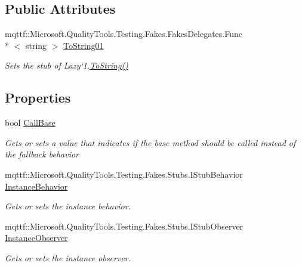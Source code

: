 \subsection*{Public Attributes}
\begin{DoxyCompactItemize}
\item 
mqttf\-::\-Microsoft.\-Quality\-Tools.\-Testing.\-Fakes.\-Fakes\-Delegates.\-Func\\*
$<$ string $>$ \hyperlink{class_system_1_1_fakes_1_1_stub_lazy_3_01_t_01_4_acf1f1cfa09104eeb7c24dbcd9a92a16c}{To\-String01}
\begin{DoxyCompactList}\small\item\em Sets the stub of Lazy`1.\hyperlink{class_system_1_1_fakes_1_1_stub_lazy_3_01_t_01_4_aee5547fcc578aeced2fc205244ccb84b}{To\-String()}\end{DoxyCompactList}\end{DoxyCompactItemize}
\subsection*{Properties}
\begin{DoxyCompactItemize}
\item 
bool \hyperlink{class_system_1_1_fakes_1_1_stub_lazy_3_01_t_01_4_a10e1278a602330f56e3e1078c9ff6a93}{Call\-Base}
\begin{DoxyCompactList}\small\item\em Gets or sets a value that indicates if the base method should be called instead of the fallback behavior\end{DoxyCompactList}\item 
mqttf\-::\-Microsoft.\-Quality\-Tools.\-Testing.\-Fakes.\-Stubs.\-I\-Stub\-Behavior \hyperlink{class_system_1_1_fakes_1_1_stub_lazy_3_01_t_01_4_ab0af5b59864cd914c71035637e9ef53d}{Instance\-Behavior}
\begin{DoxyCompactList}\small\item\em Gets or sets the instance behavior.\end{DoxyCompactList}\item 
mqttf\-::\-Microsoft.\-Quality\-Tools.\-Testing.\-Fakes.\-Stubs.\-I\-Stub\-Observer \hyperlink{class_system_1_1_fakes_1_1_stub_lazy_3_01_t_01_4_a5947423b8616e56e1c1c77d17a659618}{Instance\-Observer}
\begin{DoxyCompactList}\small\item\em Gets or sets the instance observer.\end{DoxyCompactList}\end{DoxyCompactItemize}


